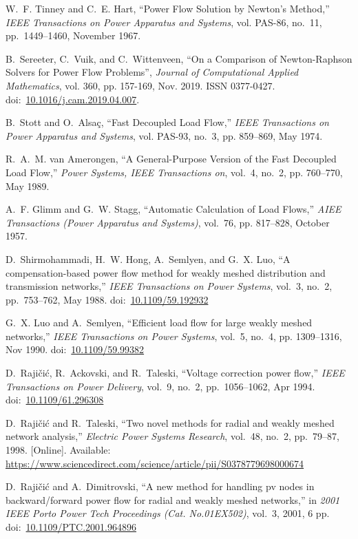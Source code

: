 \documentclass[12pt]{article}
\newcommand{\doi}[1]{doi:~\href{https://doi.org/#1}{#1}}
\numberwithin{equation}{section}
\numberwithin{table}{section}
\numberwithin{figure}{section}
\begin{document}
\begin{thebibliography}{99}
W.~F. Tinney and C.~E. Hart, ``Power Flow Solution by Newton's Method,''
  \emph{IEEE Transactions on Power Apparatus and Systems}, vol. PAS-86, no.~11,
  pp.~1449--1460, November 1967.

B.~Sereeter, C.~Vuik, and C.~Wittenveen, ``On a Comparison of Newton-Raphson Solvers for Power Flow Problems'', \emph{Journal of Computational Applied Mathematics}, vol. 360, pp. 157-169, Nov. 2019. ISSN 0377-0427. \doi{10.1016/j.cam.2019.04.007}.

B.~Stott and O.~Alsa{\c c}, ``Fast Decoupled Load Flow,'' \emph{IEEE
  Transactions on Power Apparatus and Systems}, vol. PAS-93, no.~3, pp.
  859--869, May 1974.

R.~A.~M. van Amerongen, ``A General-Purpose Version of the Fast Decoupled Load
  Flow,'' \emph{Power Systems, IEEE Transactions on}, vol.~4, no.~2, pp.
  760--770, May 1989.

A.~F. Glimm and G.~W. Stagg, ``Automatic Calculation of Load Flows,''
  \emph{AIEE Transactions (Power Apparatus and Systems)}, vol.~76, pp.
  817--828, October 1957.

D.~Shirmohammadi, H.~W. Hong, A.~Semlyen, and G.~X. Luo, ``A compensation-based
  power flow method for weakly meshed distribution and transmission networks,''
  \emph{IEEE Transactions on Power Systems}, vol.~3, no.~2, pp.~753--762, May
  1988.
  \doi{10.1109/59.192932}

G.~X. Luo and A.~Semlyen, ``Efficient load flow for large weakly meshed
  networks,'' \emph{IEEE Transactions on Power Systems}, vol.~5, no.~4, pp.
  1309--1316, Nov 1990.
  \doi{10.1109/59.99382}

D.~Raji\v{c}i\'{c}, R.~Ackovski, and R.~Taleski, ``Voltage correction power flow,''
  \emph{IEEE Transactions on Power Delivery}, vol.~9, no.~2, pp.~1056--1062,
  Apr 1994.
  \doi{10.1109/61.296308}

D.~Raji\v{c}i\'{c} and R.~Taleski, ``Two novel methods for radial and weakly
  meshed network analysis,'' \emph{Electric Power Systems Research}, vol.~48,
  no.~2, pp.~79--87, 1998. [Online]. Available:
  \url{https://www.sciencedirect.com/science/article/pii/S0378779698000674}

D.~Raji\v{c}i\'{c} and A.~Dimitrovski, ``A new method for handling pv nodes in
backward/forward power flow for radial and weakly meshed networks,'' in
\emph{2001 IEEE Porto Power Tech Proceedings (Cat. No.01EX502)}, vol.~3,
2001, 6 pp.\\
\doi{10.1109/PTC.2001.964896}


\end{thebibliography}
\end{document}
